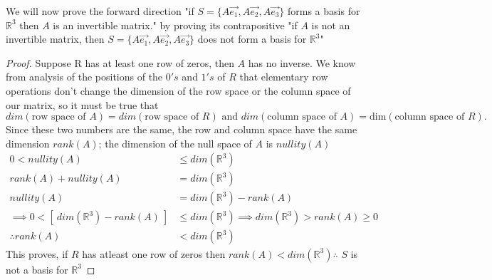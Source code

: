 \documentclass[../main.tex]{subfiles}
\begin{document}
We will now prove the forward direction "if $S = \{ A\vec{e_1},A\vec{e_2},A\vec{e_3} \}$ forms a basis for $\mathbb{R}^3$ then $A$ is an invertible matrix."
by proving its contrapositive "if $A$ is not an invertible matrix, then $S = \{A\vec{e_1},A\vec{e_2},A\vec{e_3} \}$ does not form a basis for $\mathbb{R}^3$"
\begin{proof}
  Suppose R has at least one row of zeros, then $A$ has no inverse. We know from analysis of the positions of the $0's$ and $1's$ of $R$ that elementary row operations don't change the dimension of the row space or the column space of our matrix, so it must be true that
  $$dim(\textrm{row space of } A) = dim(\textrm{row space of } R) \text{ and }dim(\textrm{column space of }A) = \textrm{dim}(\textrm{column space of } R). $$
  Since these two numbers are the same, the row and column space have the same dimension $rank(A)$; the dimension of the null space of $A$ is $nullity(A)$
  \begin{align*}
    0 < nullity(A)                                  & \leq dim(\mathbb{R}^3)                                                        \\
    rank(A) + nullity(A)                            & = dim(\mathbb{R}^3)                                                           \\
    nullity(A)                                      & = dim(\mathbb{R}^3) - rank(A)                                                 \\
    \implies  0 < [\ dim(\mathbb{R}^3) - rank(A)\ ] & \leq dim(\mathbb{R}^3) \implies  dim(\mathbb{R}^3)  > rank(A)          \geq 0 \\
    \therefore rank(A)                              & < dim(\mathbb{R}^3)
  \end{align*}
  This proves, if $R$ has atleast one row of zeros then $rank(A)<dim(\mathbb{R}^3) \therefore$ $S$ is not a basis for $\mathbb{R}^3$
\end{proof}
\end{document}
